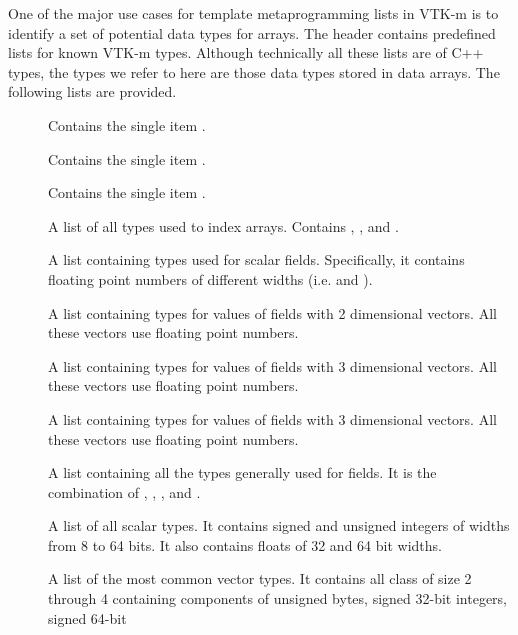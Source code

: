 
One of the major use cases for template metaprogramming lists in VTK-m is
to identify a set of potential data types for arrays. The
 header contains predefined lists for known
VTK-m types. Although technically all these lists are of C++ types, the
types we refer to here are those data types stored in data arrays. The
following lists are provided.

\begin{description}
\item[] Contains the single item .
\item[] Contains the single item .
\item[] Contains the single item .
\item[] A list of all types used to index
  arrays. Contains , , and .
\item[] A list containing types used for
  scalar fields. Specifically, it contains floating point numbers of
  different widths (i.e.  and ).
\item[] A list containing types for values of
  fields with 2 dimensional vectors. All these vectors use floating point
  numbers.
\item[] A list containing types for values of
  fields with 3 dimensional vectors. All these vectors use floating point
  numbers.
\item[] A list containing types for values of
  fields with 3 dimensional vectors. All these vectors use floating point
  numbers.
\item[] A list containing all the types generally
  used for fields. It is the combination of ,
  , , and
  .
\item[] A list of all scalar types. It contains
  signed and unsigned integers of widths from 8 to 64 bits. It also
  contains floats of 32 and 64 bit widths.
\item[] A list of the most common vector
  types. It contains all  class of size 2 through 4 containing
  components of unsigned bytes, signed 32-bit integers, signed 64-bit

\end{description}
